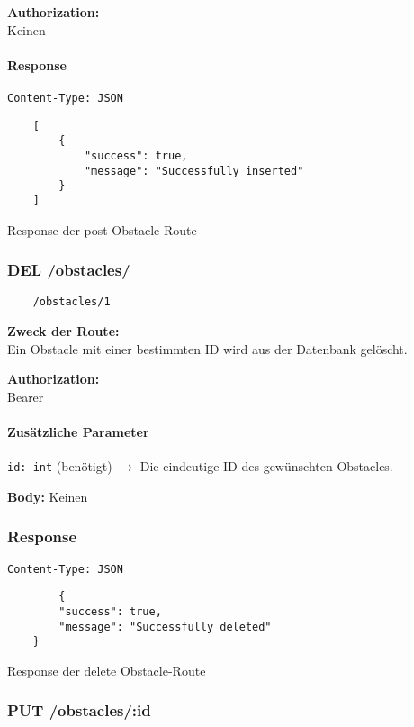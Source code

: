\textbf{Authorization:} \\
Keinen

\paragraph{Response}
\begin{code}
    \lstinline{Content-Type: JSON}
    \begin{lstlisting}
    [
        {
            "success": true,
            "message": "Successfully inserted"
        }
    ]
    \end{lstlisting}
    \caption{Response der post Obstacle-Route}
\end{code}

\pagebreak


\subsubsection{DEL /obstacles/}

\begin{lstlisting}
    /obstacles/1
\end{lstlisting}

\textbf{Zweck der Route:} \\
Ein Obstacle mit einer bestimmten ID wird aus der Datenbank gelöscht.

\textbf{Authorization:} \\
Bearer

\paragraph{Zusätzliche Parameter}
\lstinline{id: int} (benötigt)
$\rightarrow$ Die eindeutige ID des gewünschten Obstacles.

\textbf{Body:}
Keinen


\subsubsection{Response}
\begin{code}
    \lstinline{Content-Type: JSON}
    \begin{lstlisting}
        {
        "success": true,
        "message": "Successfully deleted"
    }
    \end{lstlisting}
    \caption{Response der delete Obstacle-Route}
\end{code}

\pagebreak


\subsubsection{PUT /obstacles/:id}

